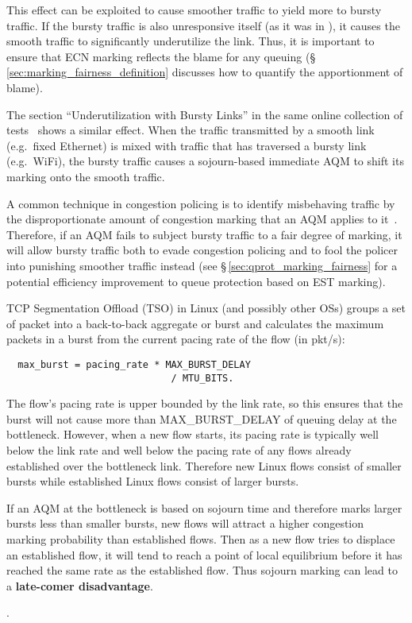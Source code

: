 This effect can be exploited to cause smoother traffic to yield more to bursty traffic. If the bursty traffic is also unresponsive itself (as it was in \cite{Heist20:L4S_tests}), it causes the smooth traffic to significantly underutilize the link. Thus, it is important to ensure that ECN marking reflects the blame for any queuing (\S\,\ref{sec:marking_fairness_definition} discusses how to quantify the apportionment of blame).

The section ``Underutilization with Bursty Links'' in the same online collection of tests~\cite{Heist20:L4S_tests} shows a similar effect. When the traffic transmitted by a smooth link (e.g.\ fixed Ethernet) is mixed with traffic that has traversed a bursty link (e.g.\ WiFi), the bursty traffic causes a sojourn-based immediate AQM to shift its marking onto the smooth traffic.

A common technique in congestion policing is to identify misbehaving traffic by the disproportionate amount of congestion marking that an AQM applies to it~\cite{Floyd99:Penalty_box}. Therefore, if an AQM fails to subject bursty traffic to a fair degree of marking, it will allow bursty traffic both to evade congestion policing and to fool the policer into punishing smoother traffic instead (see \S\,\ref{sec:qprot_marking_fairness} for a potential efficiency improvement to queue protection based on EST marking).

TCP Segmentation Offload (TSO) in Linux (and possibly other OSs) groups a set of packet into a back-to-back aggregate or burst and calculates the maximum packets in a burst from the current pacing rate of the flow (in pkt/s):
\begin{verbatim}
  max_burst = pacing_rate * MAX_BURST_DELAY
                             / MTU_BITS.
\end{verbatim}
The flow's pacing rate is upper bounded by the link rate, so this ensures that the burst will not cause more than MAX\_BURST\_DELAY of queuing delay at the bottleneck. However, when a new flow starts, its pacing rate is typically well below the link rate and well below the pacing rate of any flows already established over the bottleneck link. Therefore new Linux flows consist of smaller bursts while established Linux flows consist of larger bursts. 

If an AQM at the bottleneck is based on sojourn time and therefore marks larger bursts less than smaller bursts, new flows will attract a higher congestion marking probability than established flows. Then as a new flow tries to displace an established flow, it will tend to reach a point of local equilibrium before it has reached the same rate as the established flow. Thus sojourn marking can lead to a \textbf{late-comer disadvantage}.

.

